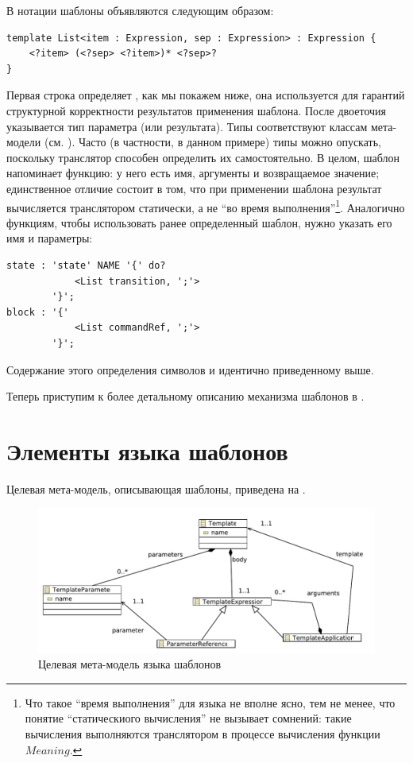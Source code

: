 В нотации  шаблоны объявляются следующим образом:
\begin{lstlisting}[xleftmargin=.5cm]
template List<item : Expression, sep : Expression> : Expression {
	<?item> (<?sep> <?item>)* <?sep>?
}
\end{lstlisting}
Первая строка определяет , как мы покажем ниже, она используется для гарантий структурной корректности результатов применения шаблона. После двоеточия указывается тип параметра (или результата). Типы соответствуют классам мета-модели  (см. ). Часто (в частности, в данном примере) типы можно опускать, поскольку транслятор способен определить их самостоятельно. В целом, шаблон напоминает функцию: у него есть имя, аргументы и возвращаемое значение; единственное отличие состоит в том, что при применении шаблона результат вычисляется транслятором статически, а не ``во время выполнения''\footnote{Что такое ``время выполнения'' для языка  не вполне ясно, тем не менее, что понятие ``статическиого вычисления'' не вызывает сомнений: такие вычисления выполняются транслятором в процессе вычисления функции $Meaning$.}. Аналогично функциям, чтобы использовать ранее определенный шаблон, нужно указать его имя и параметры:
\begin{lstlisting}
state : 'state' NAME '{' do? 
			<List transition, ';'>
		'}';
block : '{' 
			<List commandRef, ';'>
		'}';
\end{lstlisting}
Содержание этого определения символов  и  идентично приведенному выше.

Теперь приступим к более детальному описанию механизма шаблонов в .

\section{Элементы языка шаблонов}
Целевая мета-модель, описывающая шаблоны, приведена на .

\begin{figure}[htbp]
	\centering
	\includegraphics[width=.6\textwidth]{template.pdf}
	\caption{Целевая мета-модель языка шаблонов}\label{TempMM}
\end{figure}

